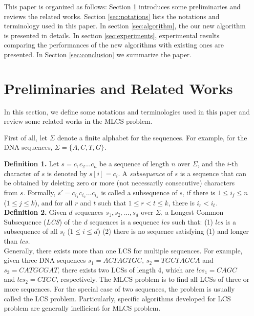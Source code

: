 \documentclass{article}
\begin{document}
This paper is organized as follows: Section \ref{sec:related works}
introduces some preliminaries and reviews the related works. Section
\ref{sec:notations} lists the notations and terminology used in this
paper. In section \ref{sec:algorithm}, the our new algorithm is
presented in details. In section \ref{sec:experiments}, experimental
results comparing the performances of the new algorithms with existing
ones are presented. In Section \ref{sec:conclusion} we summarize the
paper.

\section{Preliminaries and Related Works}
\label{sec:related works}

In this section, we define some notations and terminologies used in
this paper and review some related works in the MLCS problem.

First of all, let $\Sigma$ denote a finite alphabet for the sequences.
For example, for the DNA sequences, $\Sigma=\{A, C, T, G\}$.

\textbf{Definition 1.} Let $s=c_1c_2...c_n$ be a sequence of length
$n$ over $\Sigma$, and the $i$-th character of $s$ is denoted by
$s[i]=c_i$. A \emph{subsequence} of $s$ is a sequence that can be
obtained by deleting zero or more (not necessarily consecutive)
characters from $s$. Formally, $s'=c_{i_1}c_{i_2}...c_{i_k}$ is called
a subsequence of $s$, if there is $1 \leq i_j \leq n$
($1 \leq j \leq k$), and for all $r$ and $t$ such that
$1 \leq r < t \leq k$,
there is $i_r < i_t$.\\

\textbf{Definition 2.} Given $d$ sequences $s_1, s_2, ..., s_d$ over
$\Sigma$, a Longest Common Subsequence (\emph{LCS}) of the $d$
sequences is a sequence $lcs$ such that: (1) $lcs$ is a subsequence of
all $s_i$ ($1 \leq i \leq d$) (2) there is no sequence satisfying (1)
and longer than $lcs$.\\

Generally, there exists more than one LCS for multiple sequences. For
example, given three DNA sequences $s_1 = ACTAGTGC$, $s_2 = TGCTAGCA$
and $s_3 = CATGCGAT$, there exists two LCSs of length 4, which are
$lcs_1 = CAGC$ and $lcs_2 = CTGC$, respectively. The MLCS problem is
to find all LCSs of three or more sequences. For the special case of
two sequences, the problem is usually called the LCS
problem. Particularly, specific algorithms developed for LCS problem
are generally inefficient for
MLCS problem.\\
\end{document}
